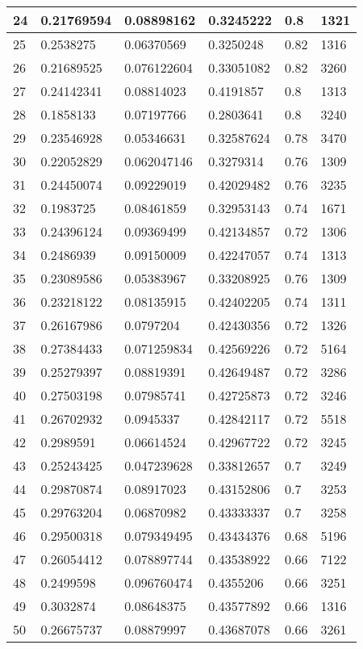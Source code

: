 \begin{longtable}{|l|l|l|l|l|l|}
24 & 0.21769594 & 0.08898162 & 0.3245222 & 0.8 & 1321 \\ \hline 
25 & 0.2538275 & 0.06370569 & 0.3250248 & 0.82 & 1316 \\ \hline 
26 & 0.21689525 & 0.076122604 & 0.33051082 & 0.82 & 3260 \\ \hline 
27 & 0.24142341 & 0.08814023 & 0.4191857 & 0.8 & 1313 \\ \hline 
28 & 0.1858133 & 0.07197766 & 0.2803641 & 0.8 & 3240 \\ \hline 
29 & 0.23546928 & 0.05346631 & 0.32587624 & 0.78 & 3470 \\ \hline 
30 & 0.22052829 & 0.062047146 & 0.3279314 & 0.76 & 1309 \\ \hline 
31 & 0.24450074 & 0.09229019 & 0.42029482 & 0.76 & 3235 \\ \hline 
32 & 0.1983725 & 0.08461859 & 0.32953143 & 0.74 & 1671 \\ \hline 
33 & 0.24396124 & 0.09369499 & 0.42134857 & 0.72 & 1306 \\ \hline 
34 & 0.2486939 & 0.09150009 & 0.42247057 & 0.74 & 1313 \\ \hline 
35 & 0.23089586 & 0.05383967 & 0.33208925 & 0.76 & 1309 \\ \hline 
36 & 0.23218122 & 0.08135915 & 0.42402205 & 0.74 & 1311 \\ \hline 
37 & 0.26167986 & 0.0797204 & 0.42430356 & 0.72 & 1326 \\ \hline 
38 & 0.27384433 & 0.071259834 & 0.42569226 & 0.72 & 5164 \\ \hline 
39 & 0.25279397 & 0.08819391 & 0.42649487 & 0.72 & 3286 \\ \hline 
40 & 0.27503198 & 0.07985741 & 0.42725873 & 0.72 & 3246 \\ \hline 
41 & 0.26702932 & 0.0945337 & 0.42842117 & 0.72 & 5518 \\ \hline 
42 & 0.2989591 & 0.06614524 & 0.42967722 & 0.72 & 3245 \\ \hline 
43 & 0.25243425 & 0.047239628 & 0.33812657 & 0.7 & 3249 \\ \hline 
44 & 0.29870874 & 0.08917023 & 0.43152806 & 0.7 & 3253 \\ \hline 
45 & 0.29763204 & 0.06870982 & 0.43333337 & 0.7 & 3258 \\ \hline 
46 & 0.29500318 & 0.079349495 & 0.43434376 & 0.68 & 5196 \\ \hline 
47 & 0.26054412 & 0.078897744 & 0.43538922 & 0.66 & 7122 \\ \hline 
48 & 0.2499598 & 0.096760474 & 0.4355206 & 0.66 & 3251 \\ \hline 
49 & 0.3032874 & 0.08648375 & 0.43577892 & 0.66 & 1316 \\ \hline 
50 & 0.26675737 & 0.08879997 & 0.43687078 & 0.66 & 3261 \\ \hline 
\end{longtable}